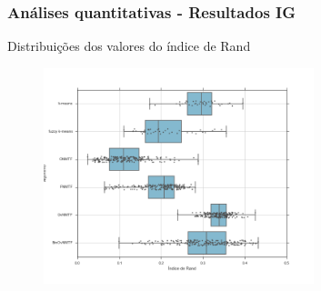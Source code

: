 \documentclass[10pt]{beamer}
\begin{document}
\begin{frame}
\frametitle{Análises quantitativas - Resultados IG }

Distribuições dos valores do índice de Rand
\begin{figure}[H]
    \centering
    \includegraphics[width=0.7\textwidth]{img/boxplot-all-rand-ig.png}
\end{figure}


\end{frame}


\end{document}
